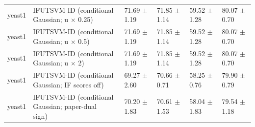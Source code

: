 \begin{table}[!t]
{\begin{tabular}{llllll}
yeast1 & \shortstack[l]{IFUTSVM-ID (conditional\\Gaussian; u \(\times\) 0.25)} & 71.69 \(\pm\) 1.19 & 71.85 \(\pm\) 1.14 & 59.52 \(\pm\) 1.28 & 80.07 \(\pm\) 0.70 \\
yeast1 & \shortstack[l]{IFUTSVM-ID (conditional\\Gaussian; u \(\times\) 0.5)} & 71.69 \(\pm\) 1.19 & 71.85 \(\pm\) 1.14 & 59.52 \(\pm\) 1.28 & 80.07 \(\pm\) 0.70 \\
yeast1 & \shortstack[l]{IFUTSVM-ID (conditional\\Gaussian; u \(\times\) 2)} & 71.69 \(\pm\) 1.19 & 71.85 \(\pm\) 1.14 & 59.52 \(\pm\) 1.28 & 80.07 \(\pm\) 0.70 \\
yeast1 & \shortstack[l]{IFUTSVM-ID (conditional\\Gaussian; IF scores off)} & 69.27 \(\pm\) 2.60 & 70.66 \(\pm\) 0.71 & 58.25 \(\pm\) 0.76 & 79.90 \(\pm\) 0.79 \\
yeast1 & \shortstack[l]{IFUTSVM-ID (conditional\\Gaussian; paper-dual\\sign)} & 70.20 \(\pm\) 1.83 & 70.61 \(\pm\) 1.53 & 58.04 \(\pm\) 1.83 & 79.54 \(\pm\) 1.18 \\
\hline
\end{tabular}%
}
\end{table}

